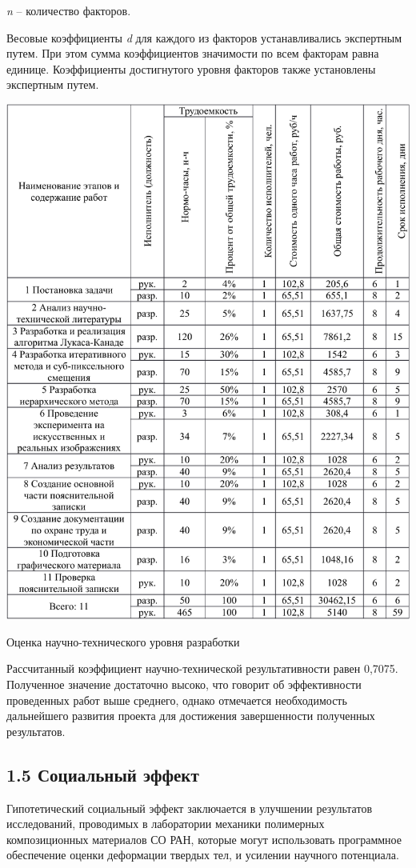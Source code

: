
\textit{n} – количество факторов.

Весовые коэффициенты \textit{d} для каждого из факторов устанавливались экспертным путем. При этом сумма коэффициентов значимости по всем факторам равна единице. Коэффициенты достигнутого уровня факторов также установлены экспертным путем.

\begin{table}[h!]
\centering
\includegraphics[page=10, width=0.9\linewidth]{econom_table.pdf}
\caption{Оценка научно-технического уровня разработки}
\label{tab:eco_10}
\end{table}
Рассчитанный коэффициент научно-технической результативности равен 0,7075. Полученное значение достаточно высоко, что говорит об эффективности проведенных работ выше среднего, однако отмечается необходимость дальнейшего развития проекта для достижения завершенности полученных результатов.

\subsection{1.5 Социальный эффект}
Гипотетический социальный эффект заключается в улучшении результатов исследований, проводимых в лаборатории механики полимерных композиционных материалов СО РАН, которые могут использовать программное обеспечение оценки деформации твердых тел, и усилении научного потенциала.